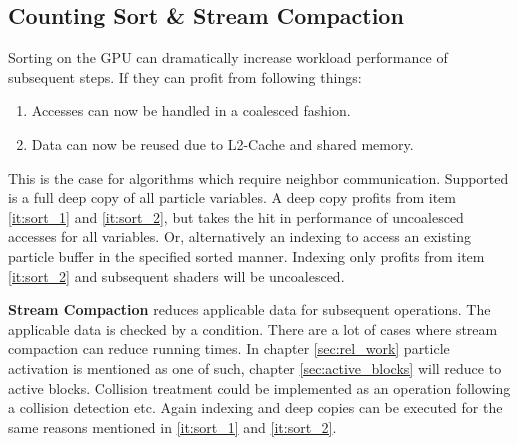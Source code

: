 \documentclass[m,times]{cgMA}
\begin{document}
\subsection{Counting Sort \& Stream Compaction}\label{sec:sort}
Sorting on the GPU can dramatically increase workload performance of subsequent steps. If they can profit from following things:
\begin{enumerate}
  \item Accesses can now be handled in a coalesced fashion. \label{it:sort_1}
  \item Data can now be reused due to L2-Cache and shared memory. \label{it:sort_2}
\end{enumerate}
This is the case for algorithms which require neighbor communication.
Supported is a full deep copy of all particle variables. A deep copy profits from item \ref{it:sort_1} and \ref{it:sort_2}, but takes the hit in performance of uncoalesced accesses for all variables. Or, alternatively an indexing to access an existing particle buffer in the specified sorted manner. Indexing only profits from item \ref{it:sort_2} and subsequent shaders will be uncoalesced.

\textbf{Stream Compaction} reduces applicable data for subsequent operations. The applicable data is checked by a condition. There are a lot of cases where stream compaction can reduce running times. In chapter \ref{sec:rel_work} particle activation is mentioned as one of such, chapter \ref{sec:active_blocks} will reduce to active blocks. Collision treatment could be implemented as an operation following a collision detection etc. Again indexing and deep copies can be executed for the same reasons mentioned in \ref{it:sort_1} and \ref{it:sort_2}.
\end{document}
